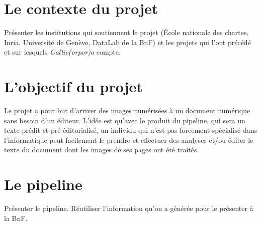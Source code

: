 \documentclass[class=article, crop=false]{standalone}
\begin{document}
\section{Le contexte du projet}

Présenter les institutions qui soutiennent le projet (École nationale des chartes, Inria, Université de Genève, DataLab de la BnF) et les projets qui l'ont précédé et sur lesquels \textit{Gallic(orpor)a} compte.

\section{L'objectif du projet}

Le projet a pour but d'arriver des images numérisées à un document numérique sans besoin d'un éditeur. L'idée est qu'avec le produit du pipeline, qui sera un texte prédit et pré-éditorialisé, un individu qui n'est pas forcement spécialisé dans l'informatique peut facilement le prendre et effectuer des analyses et/ou éditer le texte du document dont les images de ses pages ont été traités.

\section{Le pipeline}

Présenter le pipeline. Réutiliser l'information qu'on a générée pour le présenter à la BnF.
\end{document}
